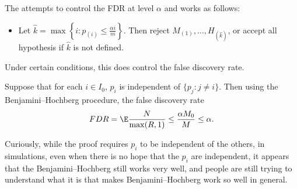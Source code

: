 \documentclass[a4paper]{article}
\begin{document}
The  attempts to control the FDR at level $\alpha$ and works as follows:
\begin{itemize}
  \item Let $\hat{k} = \max \left\{i: p_{(i)} \leq \frac{\alpha i}{m}\right\}$. Then reject $M_{(1)}, \ldots, H_{(\hat{k})}$, or accept all hypothesis if $\hat{k}$ is not defined.
\end{itemize}

Under certain conditions, this does control the false discovery rate.
\begin{thm}
  Suppose that for each $i \in I_0$, $p_i$ is independent of $\{p_j: j \not= i\}$. Then using the Benjamini--Hochberg procedure, the false discovery rate
  \[
    FDR = \E \frac{N}{\max (R, 1)} \leq \frac{\alpha M_0}{M} \leq \alpha.
  \]
\end{thm}
Curiously, while the proof requires $p_i$ to be independent of the others, in simulations, even when there is no hope that the $p_i$ are independent, it appears that the Benjamini--Hochberg still works very well, and people are still trying to understand what it is that makes Benjamini--Hochberg work so well in general.
\end{document}
